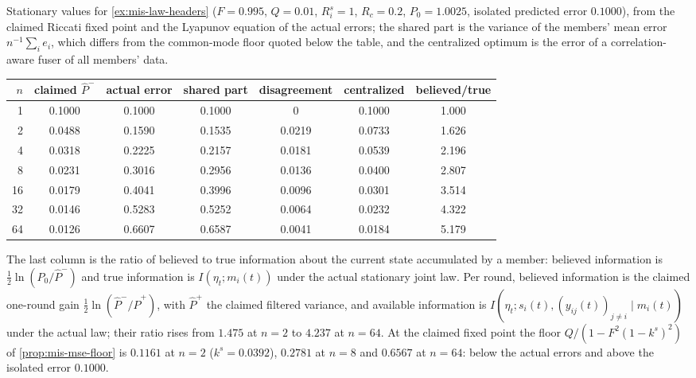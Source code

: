 \begin{numcheck}\label{chk:mis-law-headers}
Stationary values for \cref{ex:mis-law-headers} ($F=0.995$, $Q=0.01$, $R^s_i=1$, $R_c=0.2$, $P_0=1.0025$, isolated predicted error $0.1000$), from the claimed Riccati fixed point and the Lyapunov equation of the actual errors; the shared part is the variance of the members' mean error $n^{-1}\sum_ie_i$, which differs from the common-mode floor quoted below the table, and the centralized optimum is the error of a correlation-aware fuser of all members' data.
\begin{center}\small
\begin{tabular}{@{}rcccccc@{}}
\toprule
$n$ & claimed $\hat P^-$ & actual error & shared part & disagreement & centralized & believed/true\\
\midrule
1 & 0.1000 & 0.1000 & 0.1000 & 0 & 0.1000 & 1.000\\
2 & 0.0488 & 0.1590 & 0.1535 & 0.0219 & 0.0733 & 1.626\\
4 & 0.0318 & 0.2225 & 0.2157 & 0.0181 & 0.0539 & 2.196\\
8 & 0.0231 & 0.3016 & 0.2956 & 0.0136 & 0.0400 & 2.807\\
16 & 0.0179 & 0.4041 & 0.3996 & 0.0096 & 0.0301 & 3.514\\
32 & 0.0146 & 0.5283 & 0.5252 & 0.0064 & 0.0232 & 4.322\\
64 & 0.0126 & 0.6607 & 0.6587 & 0.0041 & 0.0184 & 5.179\\
\bottomrule
\end{tabular}
\end{center}
The last column is the ratio of believed to true information about the current state accumulated by a member: believed information is $\tfrac12\ln(P_0/\hat P^-)$ and true information is $I(\eta_t;m_i(t))$ under the actual stationary joint law. Per round, believed information is the claimed one-round gain $\tfrac12\ln(\hat P^-/\hat P^+)$, with $\hat P^+$ the claimed filtered variance, and available information is $I(\eta_t;s_i(t),(y_{ij}(t))_{j\ne i}\mid m_i(t))$ under the actual law; their ratio rises from $1.475$ at $n=2$ to $4.237$ at $n=64$. At the claimed fixed point the floor $Q/(1-F^2(1-k^s)^2)$ of \cref{prop:mis-mse-floor} is $0.1161$ at $n=2$ ($k^s=0.0392$), $0.2781$ at $n=8$ and $0.6567$ at $n=64$: below the actual errors and above the isolated error $0.1000$.
\end{numcheck}

